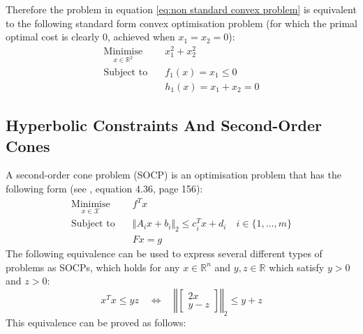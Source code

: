 Therefore the problem in equation \ref{eq:non standard convex problem} is equivalent to the following standard form convex optimisation problem (for which the primal optimal cost is clearly $0$, achieved when $x_1=x_2=0$):
\begin{align*}
    \underset{x \in \mathbb{R}^2}{\text{Minimise}} \quad & x_1^2 + x_2^2 \\
    \text{Subject to} \quad & f_1(x) = x_1 \le 0 \\
    & h_1(x) = x_1 + x_2 = 0
\end{align*}

\subsection{Hyperbolic Constraints And Second-Order Cones}
A second-order cone problem (SOCP) is an optimisation problem that has the following form (see \cite{boyd2004convex}, equation 4.36, page 156):
\begin{equation}
\begin{aligned}
    \underset{x \in \mathcal{X}}{\text{Minimise}} \quad & f^Tx \\
    \text{Subject to} \quad & \Vert A_ix + b_i \Vert_2 \le c_i^Tx + d_i \quad i\in\{1, \hdots, m\} \\
    & Fx = g
\end{aligned} \label{eq:SOCP}
\end{equation}
The following equivalence can be used to express several different types of problems as SOCPs, which holds for any $x \in \mathbb{R}^n$ and $y, z \in \mathbb{R}$ which satisfy $y>0$ and $z>0$:
\begin{equation}
    x^Tx \le yz \quad \Leftrightarrow \quad \left\Vert\begin{bmatrix}
        2x \\
        y - z
    \end{bmatrix}\right\Vert_2 \le y + z \label{eq:SOCP identity}
\end{equation}
This equivalence can be proved as follows:
